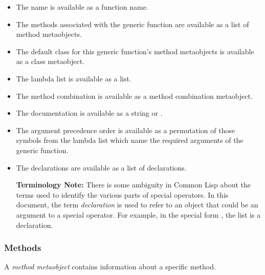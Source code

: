   \begin{itemize}
  \item 
    The name is available as a function name.

  \item 
    The methods associated with the generic function are available as a list of
    method metaobjects. 

  \item 
    The default class for this generic function's method metaobjects is
    available as a class metaobject. 

  \item 
    The lambda list is available as a list.

  \item 
    The method combination is available as a method combination metaobject. 

  \item 
    The documentation is available as a string or .

  \item 
    The argument precedence order is available as a permutation of those symbols
    from the lambda list which name the required arguments of the generic
    function. 

  \item 
    The declarations are available as a list of declarations.

    \textbf{Terminology Note:} There is some ambiguity in Common Lisp about the
      terms used to identify the various parts of  special operators. In this
      document, the term \emph{declaration} is used to refer to an object that could be
      an argument to a  special operator. For example, in the special form
      , the list  is a declaration.
  \end{itemize}


\subsubsection{Methods}

A \emph{method metaobject} contains information about a specific method.


